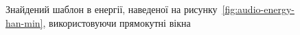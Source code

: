 \begin{figure}[h]
            \caption{Знайдений шаблон в енергії, наведеної на рисунку~\ref{fig:audio-energy-han-min}, використовуючи
                прямокутні вікна}
            \label{fig:matched-energy-han-min-rect}
        \end{figure}


